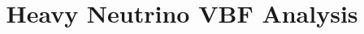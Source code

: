 \documentclass[11pt, oneside]{book}
\begin{document}









\title{Heavy Neutrino VBF Analysis} %
\end{document}
